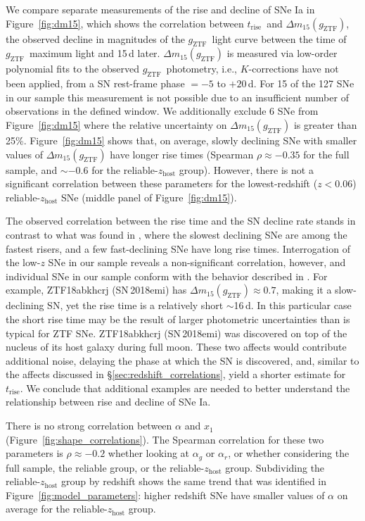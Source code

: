 \documentclass[twocolumn]{aastex63}
\newcommand{\gztf}{$g_\mathrm{ZTF}$}
\newcommand{\trise}{$t_\mathrm{rise}$}
\begin{document}
We compare separate measurements of the rise and decline of SNe Ia in
Figure~\ref{fig:dm15}, which shows the correlation between \trise\ and $\Delta
m_{15}(g_\mathrm{ZTF})$, the observed decline in magnitudes of the \gztf\
light curve between the time of \gztf\ maximum light and 15\,d later. $\Delta
m_{15}(g_\mathrm{ZTF})$ is measured via low-order polynomial fits to the
observed \gztf\ photometry, i.e., $K$-corrections have not been applied, from
a SN rest-frame phase $= -5$ to $+20$\,d. For 15 of the 127 SNe in our sample
this measurement is not possible due to an insufficient number of observations
in the defined window. We additionally exclude 6 SNe from
Figure~\ref{fig:dm15} where the relative uncertainty on $\Delta
m_{15}(g_\mathrm{ZTF})$ is greater than 25\%. Figure~\ref{fig:dm15} shows
that, on average, slowly declining SNe with smaller values of $\Delta
m_{15}(g_\mathrm{ZTF})$ have longer rise times (Spearman $\rho \approx -0.35$
for the full sample, and $\sim$$-0.6$ for the reliable-$z_\mathrm{host}$
group). However, there is not a significant correlation between these
parameters for the lowest-redshift ($z < 0.06$) reliable-$z_\mathrm{host}$ SNe
(middle panel of Figure~\ref{fig:dm15}).

The observed correlation between the rise time and the SN decline rate stands
in contrast to what was found in \citet{Hayden10}, where the slowest declining
SNe are among the fastest risers, and a few fast-declining SNe have long rise
times. Interrogation of the low-$z$ SNe in our sample reveals a
non-significant correlation, however, and individual SNe in our sample conform
with the behavior described in \citet{Hayden10}. For example, ZTF18abkhcrj
(SN\,2018emi) has $\Delta m_{15}(g_\mathrm{ZTF}) \approx 0.7$, making it a
slow-declining SN, yet the rise time is a relatively short $\sim$16\,d. In
this particular case the short rise time may be the result of larger
photometric uncertainties than is typical for ZTF SNe. ZTF18abkhcrj
(SN\,2018emi) was discovered on top of the nucleus of its host galaxy during
full moon. These two affects would contribute additional noise, delaying the
phase at which the SN is discovered, and, similar to the affects discussed in
\S\ref{sec:redshift_correlations}, yield a shorter estimate for \trise. We
conclude that additional examples are needed to better understand the
relationship between rise and decline of SNe Ia.

There is no strong correlation between $\alpha$ and $x_1$
(Figure~\ref{fig:shape_correlations}). The Spearman correlation for these two
parameters is $\rho \approx -0.2$ whether looking at $\alpha_g$ or $\alpha_r$,
or whether considering the full sample, the reliable group, or the
reliable-$z_\mathrm{host}$ group. Subdividing the reliable-$z_\mathrm{host}$
group by redshift shows the same trend that was identified in
Figure~\ref{fig:model_parameters}: higher redshift SNe have smaller values of
$\alpha$ on average for the reliable-$z_\mathrm{host}$ group.
\end{document}

